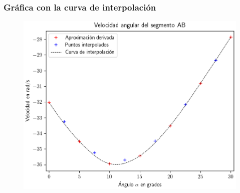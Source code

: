 \documentclass[12pt]{beamer}
\begin{document}
\begin{frame}
\frametitle{Gráfica con la curva de interpolación}
\begin{figure}
    \centering
    \includegraphics[scale=0.55]{Imagenes/diferenciacion_ejercicio_segmento_03.eps}
\end{figure}
\end{frame}
\end{document}
